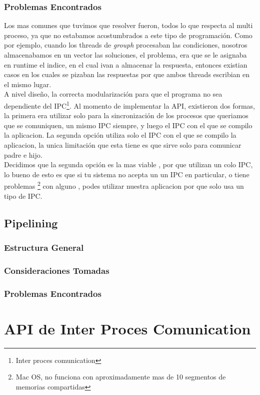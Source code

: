 \documentclass[10pt,a4paper]{article}
\begin{document}
\subsubsection{Problemas Encontrados}
Los mas comunes que tuvimos que resolver fueron, todos lo que respecta al multi proceso, ya que no estabamos acostumbrados a este tipo de programaci\'on. Como por ejemplo, cuando los threads de \textit{grouph} procesaban las condiciones, nosotros almacenabamos en un vector las soluciones, el problema, era que se le asignaba en runtime el indice, en el cual ivan a almacenar la respuesta, entonces existian casos en los cuales se pizaban las respuestas por que ambos threads escribian en el mismo lugar.\\
A nivel dise\~no, la correcta modularizaci\'on para que el programa no sea dependiente del IPC\footnote{Inter proces comunication}. Al momento de implementar la API, existieron dos formas, la primera era utilizar solo para la sincronizaci\'on de los procesos que queriamos que se comuniquen, un mismo IPC siempre, y luego el IPC con el que se compilo la aplicacion. La segunda opci\'on utiliza solo el IPC con el que se compilo la aplicacion, la unica limitaci\'on que esta tiene es que sirve solo para comunicar padre e hijo.\\
Decidimos que la segunda opci\'on es la mas viable , por que utilizan un colo IPC, lo bueno de esto es que si tu sistema no acepta un un IPC en particular, o tiene problemas \footnote{Mac OS, no funciona con aproximadamente mas de 10 segmentos de memorias compartidas} con alguno , podes utilizar nuestra aplicacion por que solo usa un tipo de IPC.
\subsection{Pipelining}
\subsubsection{Estructura General}
\subsubsection{Consideraciones Tomadas}
\subsubsection{Problemas Encontrados}
\section{API de Inter Proces Comunication}
\end{document}
